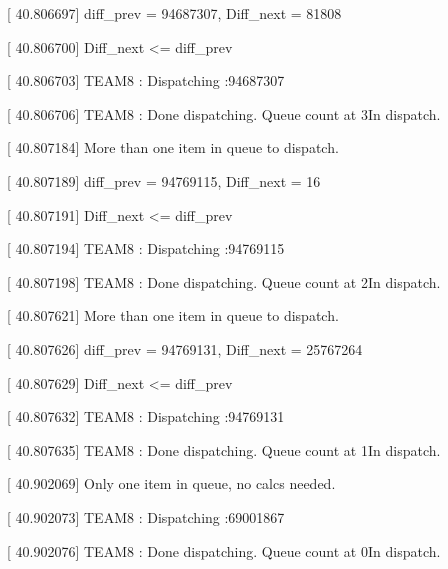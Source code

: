 \documentclass[letterpaper,10pt]{article}
\begin{document}
[   40.806697] diff\_prev = 94687307, Diff\_next = 81808 

[   40.806700] Diff\_next <= diff\_prev 

[   40.806703] TEAM8 : Dispatching :94687307 

[   40.806706] TEAM8 : Done dispatching. Queue count at 3In dispatch. 

[   40.807184] More than one item in queue to dispatch.  

[   40.807189] diff\_prev = 94769115, Diff\_next = 16 

[   40.807191] Diff\_next <= diff\_prev 

[   40.807194] TEAM8 : Dispatching :94769115 

[   40.807198] TEAM8 : Done dispatching. Queue count at 2In dispatch. 

[   40.807621] More than one item in queue to dispatch.  

[   40.807626] diff\_prev = 94769131, Diff\_next = 25767264 

[   40.807629] Diff\_next <= diff\_prev 

[   40.807632] TEAM8 : Dispatching :94769131 

[   40.807635] TEAM8 : Done dispatching. Queue count at 1In dispatch. 

[   40.902069] Only one item in queue, no calcs needed. 

[   40.902073] TEAM8 : Dispatching :69001867 

[   40.902076] TEAM8 : Done dispatching. Queue count at 0In dispatch. 

%
\end{document}
